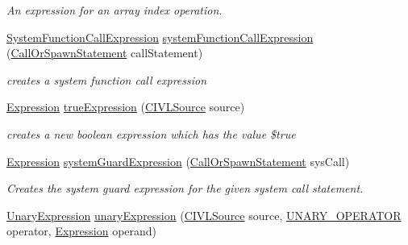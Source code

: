 \begin{DoxyCompactItemize}
\begin{DoxyCompactList}\small\item\em An expression for an array index operation. \end{DoxyCompactList}\item 
\hyperlink{interfaceedu_1_1udel_1_1cis_1_1vsl_1_1civl_1_1model_1_1IF_1_1expression_1_1SystemFunctionCallExpression}{System\+Function\+Call\+Expression} \hyperlink{interfaceedu_1_1udel_1_1cis_1_1vsl_1_1civl_1_1model_1_1IF_1_1ModelFactory_af8adfb58cc22478bd978b102c7729dac}{system\+Function\+Call\+Expression} (\hyperlink{interfaceedu_1_1udel_1_1cis_1_1vsl_1_1civl_1_1model_1_1IF_1_1statement_1_1CallOrSpawnStatement}{Call\+Or\+Spawn\+Statement} call\+Statement)
\begin{DoxyCompactList}\small\item\em creates a system function call expression \end{DoxyCompactList}\item 
\hyperlink{interfaceedu_1_1udel_1_1cis_1_1vsl_1_1civl_1_1model_1_1IF_1_1expression_1_1Expression}{Expression} \hyperlink{interfaceedu_1_1udel_1_1cis_1_1vsl_1_1civl_1_1model_1_1IF_1_1ModelFactory_a934bd7a5d28e4052a1577949f96ae566}{true\+Expression} (\hyperlink{interfaceedu_1_1udel_1_1cis_1_1vsl_1_1civl_1_1model_1_1IF_1_1CIVLSource}{C\+I\+V\+L\+Source} source)
\begin{DoxyCompactList}\small\item\em creates a new boolean expression which has the value \$true \end{DoxyCompactList}\item 
\hyperlink{interfaceedu_1_1udel_1_1cis_1_1vsl_1_1civl_1_1model_1_1IF_1_1expression_1_1Expression}{Expression} \hyperlink{interfaceedu_1_1udel_1_1cis_1_1vsl_1_1civl_1_1model_1_1IF_1_1ModelFactory_ac9810b1d988a7d2b16086b96e95d4467}{system\+Guard\+Expression} (\hyperlink{interfaceedu_1_1udel_1_1cis_1_1vsl_1_1civl_1_1model_1_1IF_1_1statement_1_1CallOrSpawnStatement}{Call\+Or\+Spawn\+Statement} sys\+Call)
\begin{DoxyCompactList}\small\item\em Creates the system guard expression for the given system call statement. \end{DoxyCompactList}\item 
\hyperlink{interfaceedu_1_1udel_1_1cis_1_1vsl_1_1civl_1_1model_1_1IF_1_1expression_1_1UnaryExpression}{Unary\+Expression} \hyperlink{interfaceedu_1_1udel_1_1cis_1_1vsl_1_1civl_1_1model_1_1IF_1_1ModelFactory_a6df78b2e934385b4738e16ec137f42df}{unary\+Expression} (\hyperlink{interfaceedu_1_1udel_1_1cis_1_1vsl_1_1civl_1_1model_1_1IF_1_1CIVLSource}{C\+I\+V\+L\+Source} source, \hyperlink{enumedu_1_1udel_1_1cis_1_1vsl_1_1civl_1_1model_1_1IF_1_1expression_1_1UnaryExpression_1_1UNARY__OPERATOR}{U\+N\+A\+R\+Y\+\_\+\+O\+P\+E\+R\+A\+T\+O\+R} operator, \hyperlink{interfaceedu_1_1udel_1_1cis_1_1vsl_1_1civl_1_1model_1_1IF_1_1expression_1_1Expression}{Expression} operand)

\end{DoxyCompactItemize}
